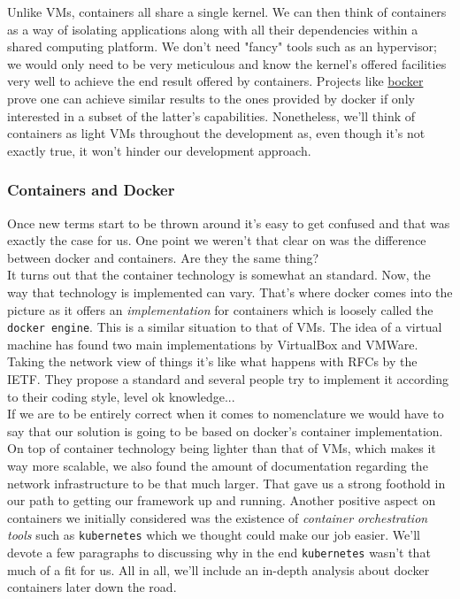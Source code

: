             Unlike VMs, containers all share a single kernel. We can then think of containers as a way of isolating applications along with all their dependencies within a shared computing platform. We don't need "fancy" tools such as an hypervisor; we would only need to be very meticulous and know the kernel's offered facilities very well to achieve the end result offered by containers. Projects like \href{https://github.com/p8952/bocker}{bocker} prove one can achieve similar results to the ones provided by docker if only interested in a subset of the latter's capabilities. Nonetheless, we'll think of containers as light VMs throughout the development as, even though it's not exactly true, it won't hinder our development approach.\\

            \subsubsection{Containers and Docker}
                Once new terms start to be thrown around it's easy to get confused and that was exactly the case for us. One point we weren't that clear on was the difference between docker and containers. Are they the same thing?\\

                It turns out that the container technology is somewhat an standard. Now, the way that technology is implemented can vary. That's where docker comes into the picture as it offers an \textit{implementation} for containers which is loosely called the \texttt{docker engine}. This is a similar situation to that of VMs. The idea of a virtual machine has found two main implementations by VirtualBox and VMWare. Taking the network view of things it's like what happens with RFCs by the IETF. They propose a standard and several people try to implement it according to their coding style, level ok knowledge...\\

                If we are to be entirely correct when it comes to nomenclature we would have to say that our solution is going to be based on docker's container implementation.\\

            On top of container technology being lighter than that of VMs, which makes it way more scalable, we also found the amount of documentation regarding the network infrastructure to be that much larger. That gave us a strong foothold in our path to getting our framework up and running. Another positive aspect on containers we initially considered was the existence of \textit{container orchestration tools} such as \texttt{kubernetes} which we thought could make our job easier. We'll devote a few paragraphs to discussing why in the end \texttt{kubernetes} wasn't that much of a fit for us. All in all, we'll include an in-depth analysis about docker containers later down the road.

